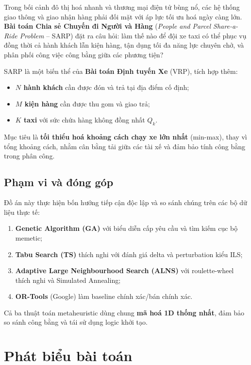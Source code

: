 \documentclass[12pt, a4paper]{article}
\newcommand{\sarp}{\textsc{SARP}}
\newcommand{\vrp}{\textsc{VRP}}
\begin{document}
Trong bối cảnh đô thị hoá nhanh và thương mại điện tử bùng nổ, các hệ thống giao thông và giao nhận hàng phải đối mặt với áp lực tối ưu hoá ngày càng lớn. \textbf{Bài toán Chia sẻ Chuyến đi Người và Hàng} (\textit{People and Parcel Share-a-Ride Problem} -- \sarp) đặt ra câu hỏi: làm thế nào để đội xe taxi có thể phục vụ đồng thời cả hành khách lẫn kiện hàng, tận dụng tối đa năng lực chuyên chở, và phân phối công việc công bằng giữa các phương tiện?

\sarp{} là một biến thể của \textbf{Bài toán Định tuyến Xe} (\vrp), tích hợp thêm:
\begin{itemize}[noitemsep]
  \item \textbf{$N$ hành khách} cần được đón và trả tại địa điểm cố định;
  \item \textbf{$M$ kiện hàng} cần được thu gom và giao trả;
  \item \textbf{$K$ taxi} với sức chứa hàng không đồng nhất $Q_k$.
\end{itemize}

Mục tiêu là \textbf{tối thiểu hoá khoảng cách chạy xe lớn nhất} (min-max), thay vì tổng khoảng cách, nhằm cân bằng tải giữa các tài xế và đảm bảo tính công bằng trong phân công.

\subsection{Phạm vi và đóng góp}

Đồ án này thực hiện bốn hướng tiếp cận độc lập và so sánh chúng trên các bộ dữ liệu thực tế:

\begin{enumerate}[noitemsep]
  \item \textbf{Genetic Algorithm (GA)} với biểu diễn cấp yêu cầu và tìm kiếm cục bộ memetic;
  \item \textbf{Tabu Search (TS)} thích nghi với đánh giá delta và perturbation kiểu ILS;
  \item \textbf{Adaptive Large Neighbourhood Search (ALNS)} với roulette-wheel thích nghi và Simulated Annealing;
  \item \textbf{OR-Tools} (Google) làm baseline chính xác/bán chính xác.
\end{enumerate}

Cả ba thuật toán metaheuristic dùng chung \textbf{mã hoá 1D thống nhất}, đảm bảo so sánh công bằng và tái sử dụng logic khởi tạo.

\section{Phát biểu bài toán}
\end{document}
